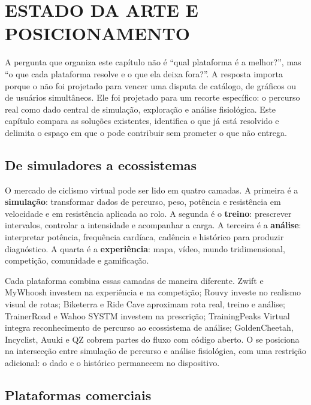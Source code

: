 
\chapter{ESTADO DA ARTE E POSICIONAMENTO}
\label{cap:estado-arte}

A pergunta que organiza este capítulo não é ``qual plataforma é a melhor?'',
mas ``o que cada plataforma resolve e o que ela deixa fora?''. A resposta
importa porque o \argus{} não foi projetado para vencer uma disputa de catálogo,
de gráficos ou de usuários simultâneos. Ele foi projetado para um recorte
específico: o percurso real como dado central de simulação, exploração e
análise fisiológica. Este capítulo compara as soluções existentes, identifica o
que já está resolvido e delimita o espaço em que o \argus{} pode contribuir sem
prometer o que não entrega.

\section{De simuladores a ecossistemas}
\label{sec:de-simuladores}

O mercado de ciclismo virtual pode ser lido em quatro camadas. A primeira é a
\textbf{simulação}: transformar dados de percurso, peso, potência e resistência
em velocidade e em resistência aplicada ao rolo. A segunda é o
\textbf{treino}: prescrever intervalos, controlar a intensidade e acompanhar a
carga. A terceira é a \textbf{análise}: interpretar potência, frequência
cardíaca, cadência e histórico para produzir diagnóstico. A quarta é a
\textbf{experiência}: mapa, vídeo, mundo tridimensional, competição, comunidade
e gamificação.

Cada plataforma combina essas camadas de maneira diferente. Zwift e MyWhoosh
investem na experiência e na competição; Rouvy investe no realismo visual de
rotas; Biketerra e Ride Cave aproximam rota real, treino e análise; TrainerRoad
e Wahoo SYSTM investem na prescrição; TrainingPeaks Virtual integra reconhecimento
de percurso ao ecossistema de análise; GoldenCheetah, Incyclist, Auuki e QZ
cobrem partes do fluxo com código aberto. O \argus{} se posiciona na
intersecção entre simulação de percurso e análise fisiológica, com uma
restrição adicional: o dado e o histórico permanecem no dispositivo.

\section{Plataformas comerciais}
\label{sec:plataformas-comerciais}

